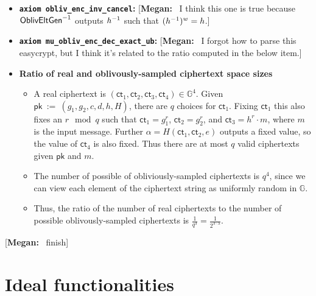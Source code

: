 \documentclass[11pt,letterpaper]{article}
\newcommand{\doclearpage}{%
  \iffull\clearpage\else\fi
}
\newcommand{\authnote}[2]{[{\color{red}\textbf{#1:}}~{\color{blue} #2}]}
\newcommand{\authnote}[2]{}
\newcommand{\megan}[1]{\authnote{Megan}{#1}}
\theoremstyle{plain} %
\theoremstyle{definition} %
\theoremstyle{remark} %
\newcommand{\code}[1]{\texttt{#1}} %
\newcommand{\eqdef}{\ {:=} \ }
\newcommand{\SecParam}{\lambda}
\newcommand{\EncKey}{\mathsf{pk}}
\newcommand{\Msg}{m}
\newcommand{\Ct}{\mathsf{ct}}
\newcommand{\Rand}{r}
\newcommand{\Group}{\mathbb{G}}
\newcommand{\GrpOrd}{q}
\newcommand{\GrpEltC}{c}
\newcommand{\GrpEltD}{d}
\newcommand{\GrpEltE}{e}
\newcommand{\GrpEltH}{h}
\newcommand{\Generator}{g}
\newcommand{\Hash}{H}
\newcommand{\Tag}{\alpha}
\begin{document}
\begin{itemize}
\item \textbf{\code{axiom obliv\_enc\_inv\_cancel}:} \megan{I think this one is true because ${\mathsf{OblivEltGen}}^{-1}$ outputs $\Inv{\GrpEltH}$ such that $(\Inv{\GrpEltH})^{\OrdW} = \GrpEltH$.}

\item \textbf{\code{axiom mu\_obliv\_enc\_dec\_exact\_ub}:} \megan{I forgot how to parse this easycrypt, but I think it's related to the ratio computed in the below item.}

\item \textbf{Ratio of real and oblivously-sampled ciphertext space sizes}
\begin{itemize}[nolistsep]
    \item A real ciphertext is $(\Ct_1,\Ct_2,\Ct_3,\Ct_4) \in \Group^4$. Given $\EncKey \eqdef (\Generator_1, \Generator_2, \GrpEltC, \GrpEltD, \GrpEltH, \Hash)$, there are $q$ choices for $\Ct_1$. Fixing $\Ct_1$ this also fixes an $\Rand \mod \GrpOrd$ such that $\Ct_1 = \Generator_1^r$, $\Ct_2 = \Generator_2^r$, and $\Ct_3 = \GrpEltH^r\cdot \Msg$, where $\Msg$ is the input message. Further $\Tag = \Hash(\Ct_1, \Ct_2, \GrpEltE)$ outputs a fixed value, so the value of $\Ct_4$ is also fixed. Thus there are at most $\GrpOrd$ valid ciphertexts given $\EncKey$ and $\Msg$.

    \item The number of possible of obliviously-sampled ciphertexts is $\GrpOrd^4$, since we can view each element of the ciphertext string as uniformly random in $\Group$.

    \item Thus, the ratio of the number of real ciphertexts to the number of possible oblivously-sampled ciphertexts is $\frac{1}{\GrpOrd^3} = \frac{1}{2^{3\cdot\SecParam}}$.
\end{itemize}

\end{itemize}

\megan{finish}
\doclearpage
\section{Ideal functionalities}
\label{sec:ideal-functionalities}
\end{document}
